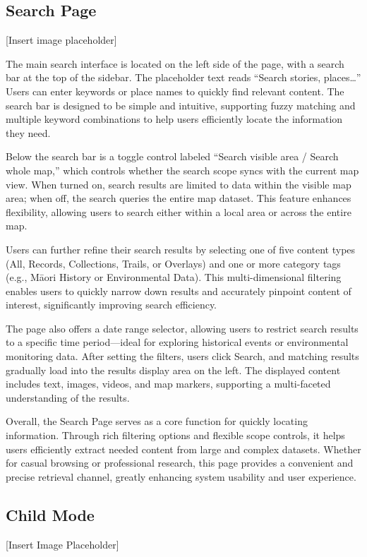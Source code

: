 \subsection{Search Page}
[Insert image placeholder]

The main search interface is located on the left side of the page, with a search bar at the top of the sidebar. The placeholder text reads “Search stories, places…” Users can enter keywords or place names to quickly find relevant content. The search bar is designed to be simple and intuitive, supporting fuzzy matching and multiple keyword combinations to help users efficiently locate the information they need.

Below the search bar is a toggle control labeled “Search visible area / Search whole map,” which controls whether the search scope syncs with the current map view. When turned on, search results are limited to data within the visible map area; when off, the search queries the entire map dataset. This feature enhances flexibility, allowing users to search either within a local area or across the entire map.

Users can further refine their search results by selecting one of five content types (All, Records, Collections, Trails, or Overlays) and one or more category tags (e.g., Māori History or Environmental Data). This multi-dimensional filtering enables users to quickly narrow down results and accurately pinpoint content of interest, significantly improving search efficiency.

The page also offers a date range selector, allowing users to restrict search results to a specific time period—ideal for exploring historical events or environmental monitoring data. After setting the filters, users click Search, and matching results gradually load into the results display area on the left. The displayed content includes text, images, videos, and map markers, supporting a multi-faceted understanding of the results.

Overall, the Search Page serves as a core function for quickly locating information. Through rich filtering options and flexible scope controls, it helps users efficiently extract needed content from large and complex datasets. Whether for casual browsing or professional research, this page provides a convenient and precise retrieval channel, greatly enhancing system usability and user experience.

\subsection{Child Mode}
[Insert Image Placeholder]

